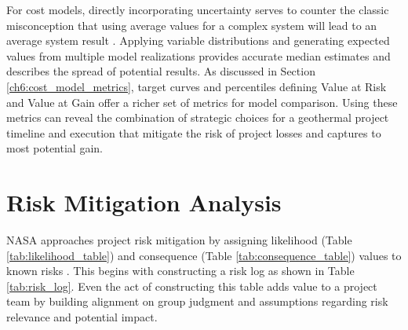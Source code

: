 For cost models, directly incorporating uncertainty serves to counter the classic misconception that using average values for a complex system will lead to an average system result \citep[Flaw of Averages,][p.\ 17-19]{de_neufville_flexibility_2011}. Applying variable distributions and generating expected values from multiple model realizations provides accurate median estimates and describes the spread of potential results. As discussed in Section \ref{ch6:cost_model_metrics}, target curves and percentiles defining Value at Risk and Value at Gain offer a richer set of metrics for model comparison. Using these metrics can reveal the combination of strategic choices for a geothermal project timeline and execution that mitigate the risk of project losses and captures to most potential gain.

\section{Risk Mitigation Analysis}
\label{ch7:risk_mitigation}

NASA approaches project risk mitigation by assigning likelihood (Table \ref{tab:likelihood_table}) and consequence (Table \ref{tab:consequence_table}) values to known risks \citep{malone_development_2004}. This begins with constructing a risk log as shown in Table \ref{tab:risk_log}. Even the act of constructing this table adds value to a project team by building alignment on group judgment and assumptions regarding risk relevance and potential impact.

\begin{table}[!htp]
\caption[Geothermal risk log]{Subset of geothermal project risks, each assigned a likelihood of occurrence (see Table \ref{tab:likelihood_table}) and consequence (see Table \ref{tab:consequence_table}). Risk is likelihood $\times$ consequence.}
\label{tab:risk_log}
\end{table}

